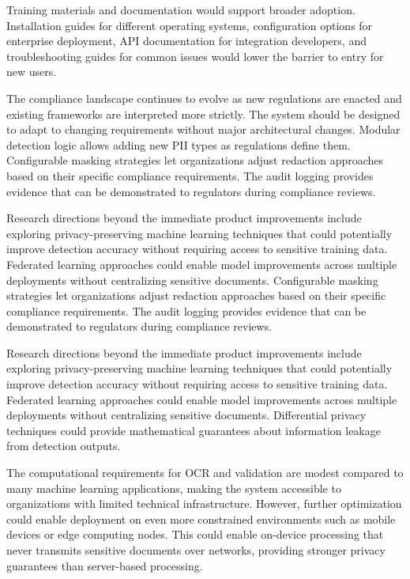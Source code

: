 Training materials and documentation would support broader adoption. Installation guides for different operating systems, configuration options for enterprise deployment, API documentation for integration developers, and troubleshooting guides for common issues would lower the barrier to entry for new users.

The compliance landscape continues to evolve as new regulations are enacted and existing frameworks are interpreted more strictly. The system should be designed to adapt to changing requirements without major architectural changes. Modular detection logic allows adding new PII types as regulations define them. Configurable masking strategies let organizations adjust redaction approaches based on their specific compliance requirements. The audit logging provides evidence that can be demonstrated to regulators during compliance reviews.

\bigskip

Research directions beyond the immediate product improvements include exploring privacy-preserving machine learning techniques that could potentially improve detection accuracy without requiring access to sensitive training data. Federated learning approaches could enable model improvements across multiple deployments without centralizing sensitive documents. Configurable masking strategies let organizations adjust redaction approaches based on their specific compliance requirements. The audit logging provides evidence that can be demonstrated to regulators during compliance reviews.

\bigskip

Research directions beyond the immediate product improvements include exploring privacy-preserving machine learning techniques that could potentially improve detection accuracy without requiring access to sensitive training data. Federated learning approaches could enable model improvements across multiple deployments without centralizing sensitive documents. Differential privacy techniques could provide mathematical guarantees about information leakage from detection outputs.

The computational requirements for OCR and validation are modest compared to many machine learning applications, making the system accessible to organizations with limited technical infrastructure. However, further optimization could enable deployment on even more constrained environments such as mobile devices or edge computing nodes. This could enable on-device processing that never transmits sensitive documents over networks, providing stronger privacy guarantees than server-based processing.

